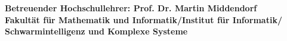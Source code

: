 \begin{titlepage}
\begin{flushright}
	\end{flushright}
	
	\vfill
	
	\begin{flushleft}
		
		\textbf{Betreuender Hochschullehrer: Prof. Dr. Martin Middendorf}\\
		\textbf{\hspace{1mm} Fakultät für Mathematik und Informatik/Institut für Informatik/}\\
		\textbf{\hspace{1mm} Schwarmintelligenz und Komplexe Systeme}
		
	\end{flushleft}
	
		
		
		
		
		
		
		
		
		
		
		
		
		
		
		
\end{titlepage}